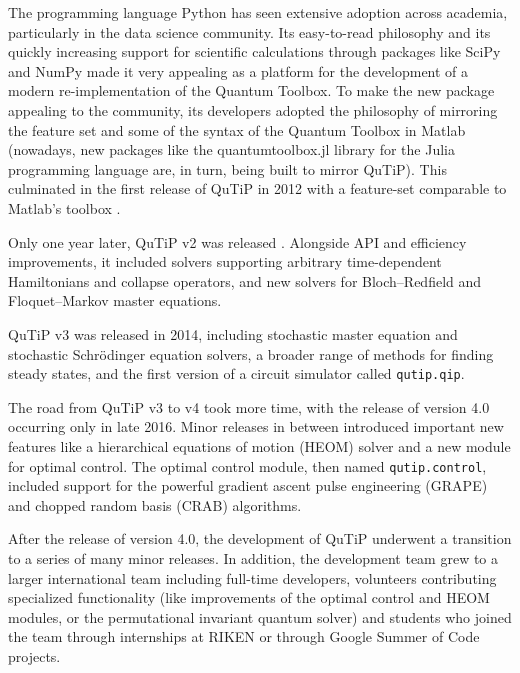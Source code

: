 \documentclass[preprint,3p,sort&compress]{elsarticle}
\def\code#1{\texttt{#1}}
\begin{document}
The programming language Python has seen extensive adoption across academia, particularly in the data science community. Its easy-to-read philosophy and its quickly increasing support for scientific calculations through packages like SciPy and NumPy made it very appealing as a platform for the development of a modern re-implementation of the Quantum Toolbox. To make the new package appealing to the community, its developers adopted the philosophy of mirroring the feature set and some of the syntax of the Quantum Toolbox in Matlab (nowadays, new packages like the quantumtoolbox.jl library for the Julia programming language are, in turn, being built to mirror QuTiP). %
This culminated in the first release of QuTiP in 2012 with a feature-set comparable to Matlab's toolbox \cite{Johansson12}. 

Only one year later, QuTiP v2 was released \cite{Johansson13}. Alongside API and efficiency improvements, it included solvers supporting arbitrary time-dependent Hamiltonians and collapse operators, and new solvers for Bloch–Redfield and Floquet–Markov master equations.

QuTiP v3 was released in 2014, including stochastic master equation and stochastic Schrödinger equation solvers, a broader range of methods for finding steady states, and the first version of a circuit simulator called \code{qutip.qip}.

The road from QuTiP v3 to v4 took more time, with the release of version 4.0 occurring only in late 2016. Minor releases in between introduced important new features like a hierarchical equations of motion (HEOM) solver and a new module for optimal control.
The optimal control module, then named \code{qutip.control}, included support for the powerful gradient ascent pulse engineering (GRAPE) and chopped random basis (CRAB) algorithms.

After the release of version 4.0, the development of QuTiP underwent a transition to a series of many minor releases.   In addition, the development team grew to a larger international team including full-time developers, volunteers contributing specialized functionality (like improvements of the optimal control and HEOM modules, or the permutational invariant quantum solver) and students who joined the team through internships at RIKEN or through Google Summer of Code projects.%
\end{document}
